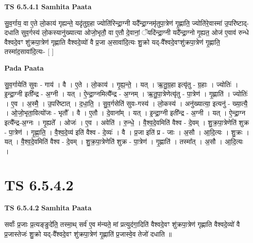\documentclass[17pt]{extarticle}
\begin{document}
\textbf{TS 6.5.4.1 } \newline
\textbf{Samhita Paata} \newline

सु॒व॒र्गाय॒ वा ए॒ते लो॒काय॑ गृह्यन्ते॒ यदृ॑तुग्र॒हा ज्योति॑रिन्द्रा॒ग्नी यदै᳚न्द्रा॒ग्नमृ॑तुपा॒त्रेण॑ गृ॒ह्णाति॒ ज्योति॑रे॒वास्मा॑ उ॒परि॑ष्टाद्-दधाति सुव॒र्गस्य॑ लो॒कस्यानु॑ख्यात्या ओजो॒भृतौ॒ वा ए॒तौ दे॒वानां॒ ॅयदि॑न्द्रा॒ग्नी यदै᳚न्द्रा॒ग्नो गृ॒ह्यत॒ ओज॑ ए॒वाव॑ रुन्धे वैश्वदे॒वꣳ शु॑क्रपा॒त्रेण॑ गृह्णाति वैश्वदे॒व्यो॑ वै प्र॒जा अ॒सावा॑दि॒त्यः शु॒क्रो यद्-वै᳚श्वदे॒वꣳशु॑क्रपा॒त्रेण॑ गृ॒ह्णाति॒ तस्मा॑द॒सावा॑दि॒त्यः- [  ] \newline

\textbf{Pada Paata} \newline

सु॒व॒र्गायेति॑ सुवः - गाय॑ । वै । ए॒ते । लो॒काय॑ । गृ॒ह्य॒न्ते॒ । यत् । ऋ॒तु॒ग्र॒हा इत्यृ॑तु - ग्र॒हाः । ज्योतिः॑ । इ॒न्द्रा॒ग्नी इती᳚न्द्र - अ॒ग्नी । यत् । ऐ॒न्द्रा॒ग्नमित्यै᳚न्द्र - अ॒ग्नम् । ऋ॒तु॒पा॒त्रेणेत्यृ॑तु - पा॒त्रेण॑ । गृ॒ह्णाति॑ । ज्योतिः॑ । ए॒व । अ॒स्मै॒ । उ॒परि॑ष्टात् । द॒धा॒ति॒ । सु॒व॒र्गसेति॑ सुवः-गस्य॑ । लो॒कस्य॑ । अनु॑ख्यात्या॒ इत्यनु॑ - ख्या॒त्यै॒ । ओ॒जो॒भृता॒वित्यो॑जः - भृतौ᳚ । वै । ए॒तौ । दे॒वाना᳚म् । यत् । इ॒न्द्रा॒ग्नी इती᳚न्द्र - अ॒ग्नी । यत् । ऐ॒न्द्रा॒ग्न इत्यै᳚न्द्र-अ॒ग्नः । गृ॒ह्यते᳚ । ओजः॑ । ए॒व । अवेति॑ । रु॒न्धे॒ । वै॒श्व॒दे॒वमिति॑ वैश्व - दे॒वम् । शु॒क्र॒पा॒त्रेणेति॑ शुक्र - पा॒त्रेण॑ । गृ॒ह्णा॒ति॒ । वै॒श्व॒दे॒व्य॑ इति॑ वैश्व - दे॒व्यः॑ । वै । प्र॒जा इति॑ प्र - जाः । अ॒सौ । आ॒दि॒त्यः । शु॒क्रः । यत् । वै॒श्व॒दे॒वमिति॑ वैश्व - दे॒वम् । शु॒क्र॒पा॒त्रेणेति॑ शुक्र - पा॒त्रेण॑ । गृ॒ह्णाति॑ । तस्मा᳚त् । अ॒सौ । आ॒दि॒त्यः ।  \newline





\section{ TS 6.5.4.2 }

\textbf{TS 6.5.4.2 } \newline
\textbf{Samhita Paata} \newline

सर्वाः᳚ प्र॒जाः प्र॒त्यङ्ङुदे॑ति॒ तस्मा॒थ् सर्व॑ ए॒व म॑न्यते॒ मां प्रत्युद॑गा॒दिति॑ वैश्वदे॒वꣳ शु॑क्रपा॒त्रेण॑ गृह्णाति वैश्वदे॒व्यो॑ वै प्र॒जास्तेजः॑ शु॒क्रो यद्-वै᳚श्वदे॒वꣳ शु॑क्रपा॒त्रेण॑ गृ॒ह्णाति॑ प्र॒जास्वे॒व तेजो॑ दधाति ॥ \newline
\end{document}
